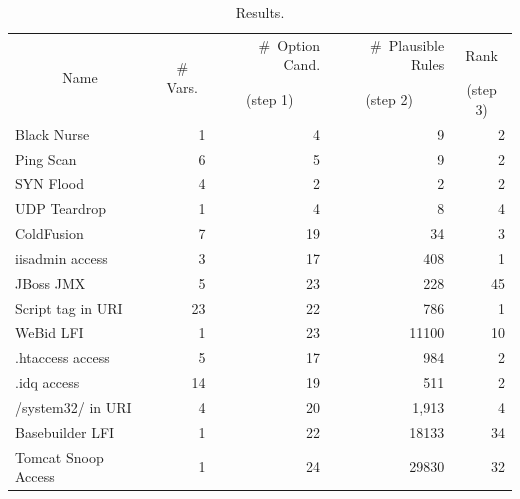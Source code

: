 \documentclass[sigconf,review, anonymous]{acmart}
\begin{document}
\setlength{\tabcolsep}{2pt}
\begin{table}[h!]
  \small
  \caption{\label{table:results}Results.}
  \vspace{-2ex}
  \centering
  \begin{tabular}{lrrrr}
    \toprule
    \multicolumn{1}{c}{\multirow{2}{*}{Name}} &
    \multicolumn{1}{c}{\multirow{2}{*}{\# Vars.}} &
    \#~Option Cand. &
    \#~Plausible Rules &    
    \multicolumn{1}{c}{Rank} \\

     &
    \multicolumn{1}{c}{} &
    \multicolumn{1}{c}{(step 1)} &
    \multicolumn{1}{c}{(step 2)} &    
    \multicolumn{1}{c}{(step 3)} \\

    \midrule
    Black Nurse & 1 & 4 & 9 & 2 \\    
    Ping Scan & 6 & 5 & 9 & 2 \\
    SYN Flood & 4 & 2 & 2 & 2 \\
    UDP Teardrop & 1 & 4 & 8 & 4 \\
    \midrule
    ColdFusion & 7 & 19 & 34 & 3\\
    iisadmin access & 3 & 17 & 408 & 1 \\        
    JBoss JMX & 5 & 23 & 228 & 45 \\
    Script tag in URI & 23 & 22 & 786 & 1 \\
    WeBid LFI & 1 & 23 & 11100 & 10\\    
    .htaccess access & 5 & 17 & 984 & 2\\
    .idq access & 14 & 19 & 511 & 2 \\
    /system32/ in URI & 4 & 20 & 1,913 & 4 \\
    Basebuilder LFI & 1 & 22 & 18133 & 34 \\
    Tomcat Snoop Access & 1 & 24 & 29830 & 32 \\
    \bottomrule
  \end{tabular}
\end{table}
\end{document}
